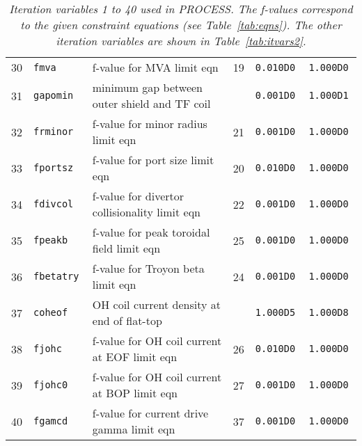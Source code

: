 \documentclass[11pt,a4paper]{report}
\makeatletter
\newcommand{\PSD}{\mbox{\it PROCESS}\@.\/ }
\makeatother
\begin{document}
\begin{table}[tbph]
\begin{center}
\begin{tabular}{||c|l|l|c|c|c||}
30  & \tt fmva        & f-value for MVA limit eqn                               & 19        & \tt 0.010D0  & \tt 1.000D0 \\
31  & \tt gapomin     & minimum gap between outer shield and TF coil            &           & \tt 0.001D0  & \tt 1.000D1 \\
32  & \tt frminor     & f-value for minor radius limit eqn                      & 21        & \tt 0.001D0  & \tt 1.000D0 \\
33  & \tt fportsz     & f-value for port size limit eqn                         & 20        & \tt 0.010D0  & \tt 1.000D0 \\
34  & \tt fdivcol     & f-value for divertor collisionality limit eqn           & 22        & \tt 0.001D0  & \tt 1.000D0 \\
35  & \tt fpeakb      & f-value for peak toroidal field limit eqn               & 25        & \tt 0.001D0  & \tt 1.000D0 \\
36  & \tt fbetatry    & f-value for Troyon beta limit eqn                       & 24        & \tt 0.001D0  & \tt 1.000D0 \\
37  & \tt coheof      & OH coil current density at end of flat-top              &           & \tt 1.000D5  & \tt 1.000D8 \\
38  & \tt fjohc       & f-value for OH coil current at EOF limit eqn            & 26        & \tt 0.010D0  & \tt 1.000D0 \\
39  & \tt fjohc0      & f-value for OH coil current at BOP limit eqn            & 27        & \tt 0.001D0  & \tt 1.000D0 \\
40  & \tt fgamcd      & f-value for current drive gamma limit eqn               & 37        & \tt 0.001D0  & \tt 1.000D0 \\ \hline
\end{tabular}
\end{center}
\caption[TABLE_VARS1]{{\it
Iteration variables 1 to 40 used in \PSD The f-values correspond to the
given constraint equations (see Table~\ref{tab:eqns}). The other iteration
variables are shown in Table~\ref{tab:itvars2}. }}
\label{tab:itvars1}
\end{table}
\normalsize
\end{document}

